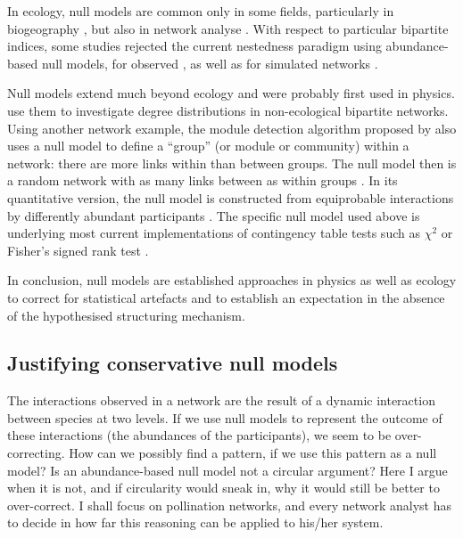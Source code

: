\documentclass[a4paper, 11pt]{article}
\newcommand{\ind}[1]{#1\index{#1}}           			   %
\begin{document}
In ecology, \ind{null model}s are common only in some fields, particularly in biogeography \citep{Gotelli1996,Hausdorf2007}, but also in network analyse \citep{Dormann2009,Joppa2009,Bluthgen2008,Vazquez2006,Vazquez2003a,Vazquez2009}. With respect to particular bipartite indices, some studies rejected the current nestedness paradigm using abundance-based null models, for observed \citep{Kallimanis2009,Moore2007,Santamaria2007}, as well as for simulated networks \citep{Krishna2008}.

Null models extend much beyond ecology and were probably first used in physics. \citet{Latapy2008} use them to investigate degree distributions in non-ecological bipartite networks. Using another network example, the module detection algorithm proposed by \citet{Newman2004} also uses a null model to define a ``group'' (or module or community) within a network: there are more links within than between groups. The null model then is a random network with as many links between as within groups \citep{Guimera2005}. In its quantitative version, the null model is constructed from equiprobable interactions by differently abundant participants \citep{Barber2004}. The specific null model used above is underlying most current implementations of contingency table tests such as $\chi^2$ or Fisher's signed rank test \citep{Patefield1981}.

In conclusion, null models are established approaches in physics as well as ecology to correct for statistical artefacts and to establish an expectation in the absence of the hypothesised structuring mechanism.

\subsection{Justifying conservative null models}
The interactions observed in a network are the result of a dynamic interaction between species at two levels. If we use null models to represent the outcome of these interactions (the abundances of the participants), we seem to be over-correcting. How can we possibly find a pattern, if we use this pattern as a null model? Is an abundance-based null model not a circular argument? Here I argue when it is not, and if \ind{circularity} would sneak in, why it would still be better to over-correct. I shall focus on pollination networks, and every network analyst has to decide in how far this reasoning can be applied to his/her system.
\end{document}
